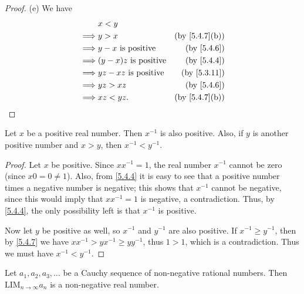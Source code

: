 \begin{proof}{(e)}
  We have
  \begin{align*}
             & x < y                                                      \\
    \implies & y > x                        & \text{(by \cref{5.4.7}(b))} \\
    \implies & y - x \text{ is positive}    & \text{(by \cref{5.4.6})}    \\
    \implies & (y - x)z \text{ is positive} & \text{(by \cref{5.4.4})}    \\
    \implies & yz - xz \text{ is positive}  & \text{(by \cref{5.3.11})}   \\
    \implies & yz > xz                      & \text{(by \cref{5.4.6})}    \\
    \implies & xz < yz.                     & \text{(by \cref{5.4.7}(b))}
  \end{align*}
\end{proof}

\begin{prop}\label{5.4.8}
  Let \(x\) be a positive real number.
  Then \(x^{-1}\) is also positive.
  Also, if \(y\) is another positive number and \(x > y\), then \(x^{-1} < y^{-1}\).
\end{prop}

\begin{proof}
  Let \(x\) be positive.
  Since \(xx^{-1} = 1\), the real number \(x^{-1}\) cannot be zero (since \(x0 = 0 \neq 1\)).
  Also, from \cref{5.4.4} it is easy to see that a positive number times a negative number is negative;
  this shows that \(x^{-1}\) cannot be negative, since this would imply that \(xx^{-1} = 1\) is negative, a contradiction.
  Thus, by \cref{5.4.4}, the only possibility left is that \(x^{-1}\) is positive.

  Now let \(y\) be positive as well, so \(x^{-1}\) and \(y^{-1}\) are also positive.
  If \(x^{-1} \geq y^{-1}\), then by \cref{5.4.7} we have \(xx^{-1} > yx^{-1} \geq yy^{-1}\), thus \(1 > 1\), which is a contradiction.
  Thus we must have \(x^{-1} < y^{-1}\).
\end{proof}

\begin{prop}\label{5.4.9}
  Let \(a_1, a_2, a_3, \dots\) be a Cauchy sequence of non-negative rational numbers.
  Then \(\text{LIM}_{n \to \infty} a_n\) is a non-negative real number.
\end{prop}


